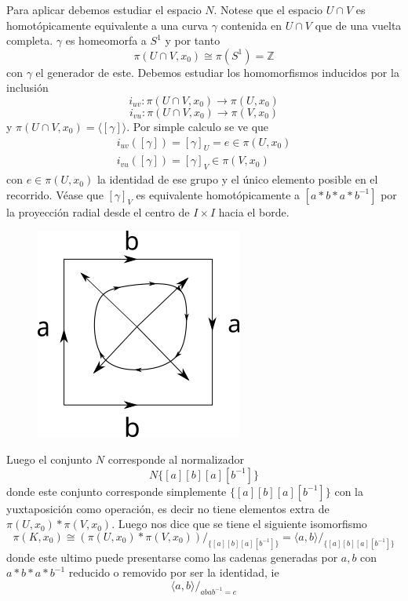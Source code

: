 \begin{ejemplo}
  Para aplicar \vank debemos estudiar el espacio \(N\). Notese que el
  espacio \(U \cap V\) es homotópicamente equivalente a una curva
  \(\gamma\) contenida en \(U \cap V\) que de una vuelta completa.
  \(\gamma\) es homeomorfa a \(S^1\) y por tanto
  \[\pi (U \cap V, x_0) \cong \pi (S^1) = \mathbb Z \]
  con \(\gamma\) el generador de este. Debemos estudiar los
  homomorfismos inducidos por la inclusión
  \[ i_{u v} : \pi (U \cap V , x_0) \longrightarrow \pi (U, x_0) \]
  \[ i_{v u} : \pi (U \cap V , x_0) \longrightarrow \pi (V, x_0) \]
  y \(  \pi (U \cap V , x_0) = \langle {[\gamma]} \rangle \). Por
  simple calculo se ve que
  \begin{gather*}
    i_{u v} ([\gamma]) = [\gamma]_{U} = e \in \pi \left( U, x_0 \right)
    \\
    i_{v u} ([\gamma]) = [\gamma]_{V} \in \pi \left( V, x_0 \right)
  \end{gather*}
  con \(e \in \pi \left( U, x_0 \right)\) la identidad de ese grupo y el
  único elemento posible en el recorrido. Véase que \([\gamma]_V\) es
  equivalente homotópicamente a \([a * b * a * b^{-1}]\) por la proyección
  radial desde el centro de \(I \times I\) hacia el borde.
  \begin{figure}[h]
    \centering \includegraphics[scale=0.5]{./imagenes/radial.png}
  \end{figure}
  Luego el conjunto \(N\) corresponde al normalizador
  \[ N \{ [a] [b] [a] [b^{-1}]\}\]
  donde este conjunto corresponde simplemente \(\{ [a] [b] [a]
  [b^{-1}]\}\) con la yuxtaposición como operación, es decir no tiene
  elementos extra de \(\pi (U,x_0) * \pi (V, x_0)\). Luego \vank nos
  dice que se tiene el siguiente isomorfismo
  \[
    \pi (K, x_0) \cong \left( \pi (U, x_0) * \pi (V, x_0) \right)
    /_{\{[a] [b] [a] [b^{-1}]\}} = \langle {a , b} \rangle
    /_{\{[a] [b] [a] [b^{-1}]\}}
  \]
  donde este ultimo puede presentarse como las cadenas generadas por
  \(a,b\) con \(a * b * a * b^{-1} \) reducido o removido por ser la
  identidad, ie
  \[ \langle a,b \rangle /_{abab^{-1} = e} \]
\end{ejemplo}

